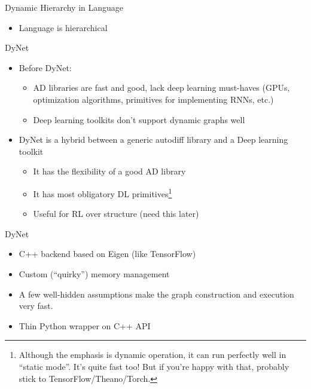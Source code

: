 \documentclass[compress]{beamer}
\newcommand{\gfx}[2]{
\begin{center}
	\texttt{[image: frameworks/\#1]}
\end{center}
}
\begin{document}
\begin{frame}{Dynamic Hierarchy in Language}

\begin{itemize}
  \item Language is hierarchical
\end{itemize}
  \vspace{-.6cm}
\only<2>{
  \gfx{hierarchy}{.9}
}
\end{frame}

\begin{frame}{DyNet}
\begin{itemize}
\item Before DyNet:
  \begin{itemize}
    \item AD libraries are fast and good, lack deep learning must-haves (GPUs, optimization algorithms, primitives for implementing RNNs, etc.)
    \item Deep learning toolkits don't support dynamic graphs well
    \end{itemize}
\item DyNet is a hybrid between a generic autodiff library and a Deep
  learning toolkit
\begin{itemize}
  \item It has the flexibility of a good AD library
    \item It has most obligatory DL primitives\footnote{Although the
        emphasis is dynamic operation, it can run perfectly well in
        ``static mode''. It's quite fast too! But if you're happy with
        that, probably stick to TensorFlow/Theano/Torch.}
      \item Useful for RL over structure (need this later)
\end{itemize}
\end{itemize}
\end{frame}

\begin{frame}{DyNet}

\begin{itemize}
\item C++ backend based on Eigen (like TensorFlow)
\item Custom (``quirky'') memory management
\item A few well-hidden assumptions make the graph construction and execution very fast.
\item Thin Python wrapper on C++ API
\end{itemize}

\end{frame}
\end{document}
